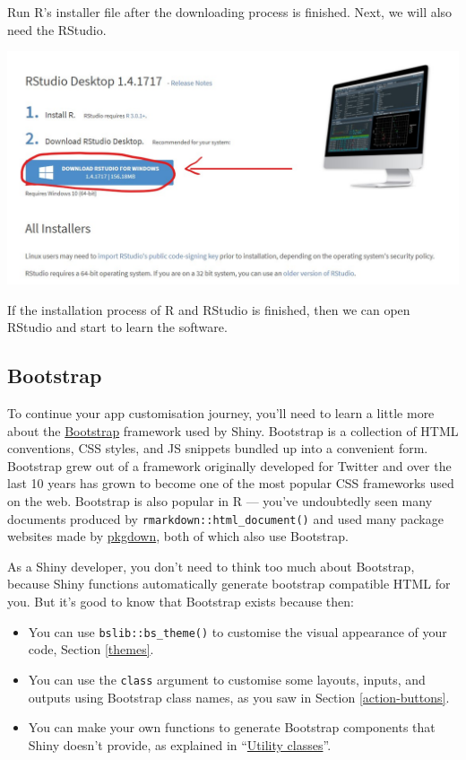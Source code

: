 \documentclass[
]{article}
\begin{document}
Run R's installer file after the downloading process is finished.
Next, we will also need the RStudio.

\href{https://www.rstudio.com/products/rstudio/download/\#download}{\includegraphics[width=6.25in,height=\textheight]{images/installr3.jpg}}

If the installation process of R and RStudio is finished, then we can open RStudio and start to learn the software.

\hypertarget{bootstrap}{%
\subsection{Bootstrap}\label{bootstrap}}

To continue your app customisation journey, you'll need to learn a little more about the \href{https://getbootstrap.com}{Bootstrap} framework used by Shiny.
Bootstrap is a collection of HTML conventions, CSS styles, and JS snippets bundled up into a convenient form.
Bootstrap grew out of a framework originally developed for Twitter and over the last 10 years has grown to become one of the most popular CSS frameworks used on the web.
Bootstrap is also popular in R --- you've undoubtedly seen many documents produced by \texttt{rmarkdown::html\_document()} and used many package websites made by \href{http://pkgdown.r-lib.org/}{pkgdown}, both of which also use Bootstrap.

As a Shiny developer, you don't need to think too much about Bootstrap, because Shiny functions automatically generate bootstrap compatible HTML for you.
But it's good to know that Bootstrap exists because then:

\begin{itemize}
\item
  You can use \texttt{bslib::bs\_theme()} to customise the visual appearance of your code, Section \ref{themes}.
\item
  You can use the \texttt{class} argument to customise some layouts, inputs, and outputs using Bootstrap class names, as you saw in Section \ref{action-buttons}.
\item
  You can make your own functions to generate Bootstrap components that Shiny doesn't provide, as explained in ``\href{https://rstudio.github.io/bslib/articles/theming.html\#utility-classes}{Utility classes}''.
\end{itemize}
\end{document}
